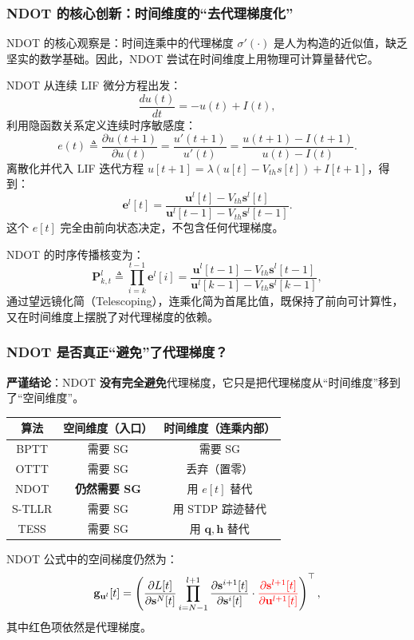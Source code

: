 \documentclass[journal,12pt,onecolumn]{IEEEtran}
\begin{document}
\subsubsection{NDOT 的核心创新：时间维度的“去代理梯度化”}

NDOT \cite{jiang_ndot_nodate} 的核心观察是：时间连乘中的代理梯度 \(\sigma'(\cdot)\) 是人为构造的近似值，缺乏坚实的数学基础。因此，NDOT 尝试在时间维度上用物理可计算量替代它。

NDOT 从连续 LIF 微分方程出发：
\[
\frac{du(t)}{dt} = -u(t) + I(t),
\]
利用隐函数关系定义连续时序敏感度：
\[
e(t) \triangleq \frac{\partial u(t+1)}{\partial u(t)} = \frac{u'(t+1)}{u'(t)}
= \frac{u(t+1) - I(t+1)}{u(t) - I(t)}.
\]
离散化并代入 LIF 迭代方程 \(u[t+1] = \lambda(u[t] - V_{th}s[t]) + I[t+1]\)，得到：
\[
\boxed{
\mathbf{e}^{l}[t] =
\frac{\mathbf{u}^{l}[t] - V_{th}\mathbf{s}^{l}[t]}
{\mathbf{u}^{l}[t-1] - V_{th}\mathbf{s}^{l}[t-1]}
}.
\]
这个 \(e[t]\) 完全由前向状态决定，不包含任何代理梯度。

NDOT 的时序传播核变为：
\[
\mathbf{P}_{k,t}^{l} \triangleq \prod_{i=k}^{t-1} \mathbf{e}^{l}[i]
= \frac{\mathbf{u}^{l}[t-1] - V_{th}\mathbf{s}^{l}[t-1]}
{\mathbf{u}^{l}[k-1] - V_{th}\mathbf{s}^{l}[k-1]},
\]
通过望远镜化简（Telescoping），连乘化简为首尾比值，既保持了前向可计算性，又在时间维度上摆脱了对代理梯度的依赖。

\subsubsection{NDOT 是否真正“避免”了代理梯度？}

\textbf{严谨结论}：NDOT \textbf{没有完全避免}代理梯度，它只是把代理梯度从“时间维度”移到了“空间维度”。

\begin{center}
\begin{tabular}{|c|c|c|}
\hline
算法 & 空间维度（入口） & 时间维度（连乘内部） \\
\hline
BPTT & 需要 SG & 需要 SG \\
OTTT & 需要 SG & 丢弃（置零） \\
NDOT & \textbf{仍然需要 SG} & 用 \(e[t]\) 替代 \\
S-TLLR & 需要 SG & 用 STDP 踪迹替代 \\
TESS & 需要 SG & 用 \(\mathbf{q}, \mathbf{h}\) 替代 \\
\hline
\end{tabular}
\end{center}

NDOT 公式中的空间梯度仍然为：
\[
\mathbf{g}_{\mathbf{u}^l}[t] =
\left(
\frac{\partial L[t]}{\partial \mathbf{s}^N[t]}
\prod_{i=N-1}^{l+1}
\frac{\partial \mathbf{s}^{i+1}[t]}{\partial \mathbf{s}^i[t]}
\cdot
{\color{red}{\frac{\partial \mathbf{s}^{l+1}[t]}{\partial \mathbf{u}^{l+1}[t]}}}
\right)^\top,
\]
其中红色项依然是代理梯度。
\end{document}
